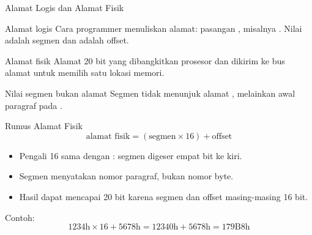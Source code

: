 \documentclass[aspectratio=169,11pt]{beamer}
\begin{document}
\begin{frame}{Alamat Logis dan Alamat Fisik}
\small
\begin{block}{Alamat logis}
\small Cara programmer menuliskan alamat: pasangan
, misalnya . Nilai
 adalah segmen dan  adalah offset.
\end{block}

\vspace{0.2em}
\begin{block}{Alamat fisik}
\small Alamat 20 bit yang dibangkitkan prosesor dan dikirim ke bus
alamat untuk memilih satu lokasi memori.
\end{block}

\vspace{0.2em}
\begin{alertblock}{Nilai segmen bukan alamat}
\small Segmen  tidak menunjuk alamat ,
melainkan awal paragraf pada .
\end{alertblock}
\end{frame}

\begin{frame}{Rumus Alamat Fisik}
\small
\[
\text{alamat fisik} = (\text{segmen} \times 16) + \text{offset}
\]

\vspace{0.2em}
\begin{itemize}
    \item Pengali 16 sama dengan : segmen digeser empat bit
          ke kiri.
    \item Segmen menyatakan nomor paragraf, bukan nomor byte.
    \item Hasil dapat mencapai 20 bit karena segmen dan offset
          masing-masing 16 bit.
\end{itemize}

\vspace{0.2em}
Contoh:
\[
\text{1234h} \times 16 + \text{5678h}
= \text{12340h} + \text{5678h} = \text{179B8h}
\]
\end{frame}
\end{document}

